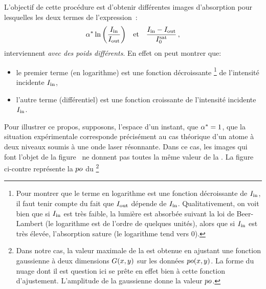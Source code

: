 \noindent L'objectif de cette procédure est d'obtenir différentes images d'absorption pour lesquelles les deux termes de l'expression~:
\[
{{\alpha}^{*}} \, {\ln\left(	\frac{{{I}_{\rm in}}}{{{I}_{\rm out}}}	\right)}
\text{~~~et~~~}
\frac{{{I}_{\rm in}} - {{I}_{\rm out}}}{{I^{\rm sat}_{0}}}
\, ,
\] 
 interviennent \emph{avec des poids différents}. En effet on peut montrer que:
\begin{itemize}
	\item le premier terme (en logarithme) est une fonction décroissante%
	\footnote{Pour montrer que le terme en logarithme est une fonction décroissante de ${{I}_{\rm in}}$, il faut tenir compte du fait que ${{I}_{\rm out}}$ dépende de ${{I}_{\rm in}}$. Qualitativement, on voit bien que si ${{I}_{\rm in}}$ est très faible, la lumière est absorbée suivant la loi de Beer-Lambert (le logarithme est de l'ordre de quelques unités), alors que si ${{I}_{\rm in}}$ est très élevée, l'absorption sature (le logarithme tend vers $0$).} de l'intensité incidente ${{I}_{\rm in}}$,
	\item l'autre terme (différentiel) est une fonction croissante de l'intensité incidente ${{I}_{\rm in}}$.
\end{itemize}
%
Pour illustrer ce propos, supposons, l'espace d'un instant, que ${{\alpha}^{*}}=1$, \cad que la situation expérimentale corresponde précisément au cas théorique d'un atome à deux niveaux soumis à une onde laser résonnante. 
\label{fig:AllureAlphaEgal1}\noindent%
Dans ce cas, les images qui font l'objet de la figure~ ne donnent pas toutes la même valeur de la \pro. La figure ci-contre représente la \pro ${{ po}}$ du \n %
%
\footnote{Dans notre cas, la valeur maximale de la \pro est obtenue en ajustant une fonction gaussienne à deux dimensions $G(x,y)$ sur les données ${ po}(x,y)$. La forme du nuage dont il est question ici se prête en effet bien à cette fonction d'ajustement. L'amplitude de la gaussienne donne la valeur ${{ po}}$.}
